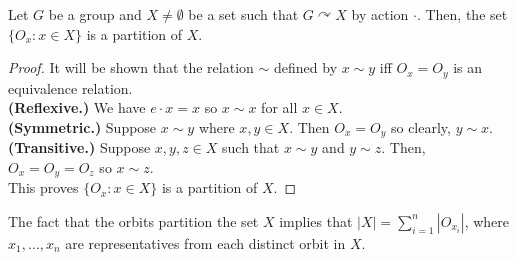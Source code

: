 \documentclass[12pt]{article}
\begin{document}
	\begin{myprop}{}{}
		Let $G$ be a group and $X\neq\emptyset$ be a set such that $G\curvearrowright X$ by action $\cdot$. Then, the set $\{O_x:x\in X\}$ is a partition of $X$.
		\begin{proof}
			It will be shown that the relation $\sim$ defined by $x\sim y$ iff $O_x=O_y$ is an equivalence relation.\\
					
			\textbf{(Reflexive.)} We have $e\cdot x=x$ so $x\sim x$ for all $x\in X$.\\
			
			\textbf{(Symmetric.)} Suppose $x\sim y$ where $x, y\in X$. Then $O_x=O_y$ so clearly, $y\sim x$.\\
			
			\textbf{(Transitive.)} Suppose $x, y, z\in X$ such that $x\sim y$ and $y\sim z$. Then, $O_x=O_y=O_z$ so $x\sim z$.\\
			
			This proves $\{O_x:x\in X\}$ is a partition of $X$.
		\end{proof}
	\end{myprop}
	
	\begin{myrem}{}{}
		The fact that the orbits partition the set $X$ implies that $|X|=\sum_{i=1}^n|O_{x_i}|$, where $x_1, \dots, x_n$ are representatives from each distinct orbit in $X$.
	\end{myrem}
	
\end{document}
